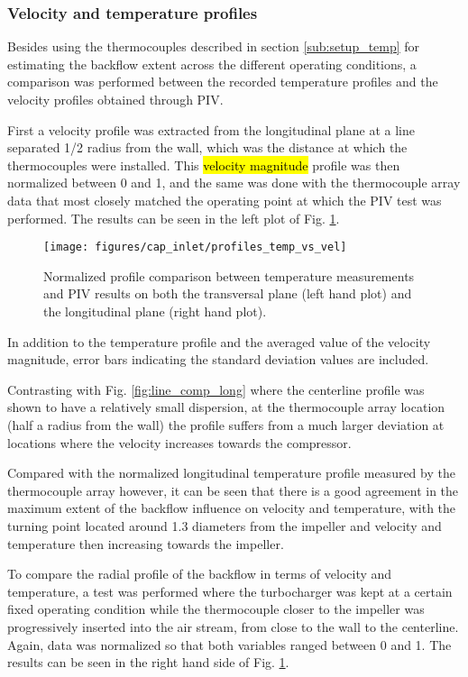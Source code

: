 \subsubsection{Velocity and temperature profiles}

Besides using the thermocouples described in section \ref{sub:setup_temp} for estimating the backflow extent across the different operating conditions, a comparison was performed between the recorded temperature profiles and the velocity profiles obtained through PIV.

First a velocity profile was extracted from the longitudinal plane at a line  separated 1/2 radius from the wall, which was the distance at which the thermocouples were installed. This \hl{velocity magnitude} profile was then normalized between 0 and 1, and the same was done with the thermocouple array data that most closely matched the operating point at which the PIV test was performed. The results can be seen in the left plot of Fig. \ref{fig:profiles_temp_vs_vel}.

\begin{figure}[thb!]
\centering
\texttt{[image: figures/cap\_inlet/profiles\_temp\_vs\_vel]}
\caption{Normalized profile comparison between temperature measurements and PIV results on both the transversal plane (left hand plot) and the longitudinal plane (right hand plot).}
\label{fig:profiles_temp_vs_vel}
\end{figure}

In addition to the temperature profile and the averaged value of the velocity magnitude, error bars indicating the standard deviation values are included. 

Contrasting with Fig. \ref{fig:line_comp_long} where the centerline profile was shown to have a relatively small dispersion, at the thermocouple array location (half a radius from the wall) the profile suffers from a much larger deviation at locations where the velocity increases towards the compressor.

Compared with the normalized longitudinal temperature profile measured by the thermocouple array however, it can be seen that there is a good agreement in the maximum extent of the backflow influence on velocity and temperature, with the turning point located around 1.3 diameters from the impeller and velocity and temperature then increasing towards the impeller.

To compare the radial profile of the backflow in terms of velocity and temperature, a test was performed where the turbocharger was kept at a certain fixed operating condition while the thermocouple closer to the impeller was progressively inserted into the air stream, from close to the wall to the centerline. Again, data was normalized so that both variables ranged between 0 and 1. The results can be seen in the right hand side of Fig. \ref{fig:profiles_temp_vs_vel}.

